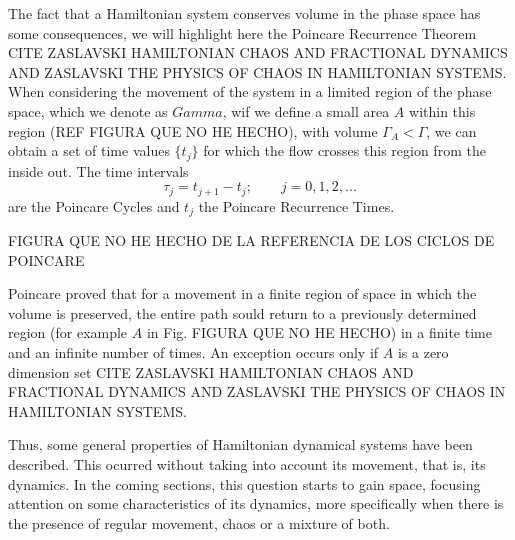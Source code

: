 The fact that a Hamiltonian system conserves volume in the phase space has some consequences, we will highlight here the Poincar\´e  Recurrence Theorem CITE ZASLAVSKI HAMILTONIAN CHAOS AND FRACTIONAL DYNAMICS AND ZASLAVSKI THE PHYSICS OF CHAOS IN HAMILTONIAN SYSTEMS. When considering the movement of the system in a limited region of the phase space, which we denote as $Gamma$, wif we define a small area $A$ within this region (REF FIGURA QUE NO HE HECHO), with volume $\Gamma_A < \Gamma$, we can obtain a set of time values $\{ t_j\}$ for which the flow crosses this region from the inside out. The time intervals
\begin{equation}
\tau_j=t_{j+1}-t_j;\qquad j=0,1,2,...
\end{equation}
are the Poincar\´e Cycles and $t_j$ the Poincar\´e Recurrence Times. \par



FIGURA QUE NO HE HECHO DE LA REFERENCIA DE LOS CICLOS DE POINCARE\par

Poincar\´e proved that for a movement in a finite region of space in which the volume is preserved, the entire path sould return to a previously determined region (for example $A$ in Fig. FIGURA QUE NO HE HECHO) in a finite time and an infinite number of times. An exception occurs only if $A$ is a zero dimension set CITE ZASLAVSKI HAMILTONIAN CHAOS AND FRACTIONAL DYNAMICS AND ZASLAVSKI THE PHYSICS OF CHAOS IN HAMILTONIAN SYSTEMS.\par 

Thus, some general properties of Hamiltonian dynamical systems have been described. This ocurred without taking into account its movement, that is, its dynamics. In the coming sections, this question starts to gain space, focusing attention on some characteristics of its dynamics, more specifically when there is the presence of regular movement, chaos or a mixture of both.




